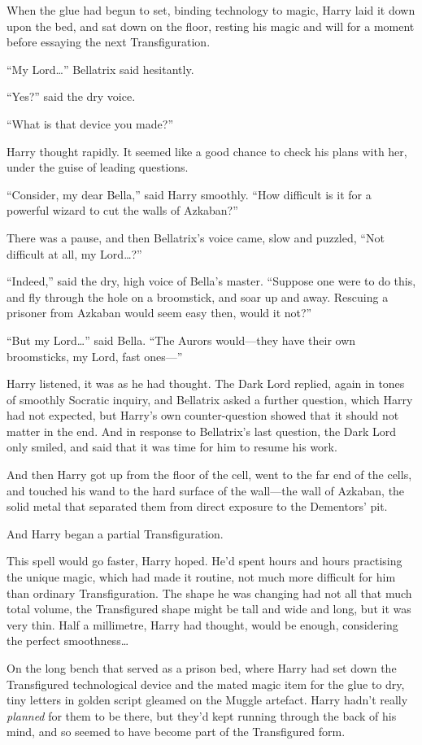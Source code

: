When the glue had begun to set, binding technology to magic, Harry laid it down upon the bed, and sat down on the floor, resting his magic and will for a moment before essaying the next Transfiguration.

“My Lord…” Bellatrix said hesitantly.

“Yes?” said the dry voice.

“What is that device you made?”

Harry thought rapidly. It seemed like a good chance to check his plans with her, under the guise of leading questions.

“Consider, my dear Bella,” said Harry smoothly. “How difficult is it for a powerful wizard to cut the walls of Azkaban?”

There was a pause, and then Bellatrix’s voice came, slow and puzzled, “Not difficult at all, my Lord…?”

“Indeed,” said the dry, high voice of Bella’s master. “Suppose one were to do this, and fly through the hole on a broomstick, and soar up and away. Rescuing a prisoner from Azkaban would seem easy then, would it not?”

“But my Lord…” said Bella. “The Aurors would—they have their own broomsticks, my Lord, fast ones—”

Harry listened, it was as he had thought. The Dark Lord replied, again in tones of smoothly Socratic inquiry, and Bellatrix asked a further question, which Harry had not expected, but Harry’s own counter-question showed that it should not matter in the end. And in response to Bellatrix’s last question, the Dark Lord only smiled, and said that it was time for him to resume his work.

And then Harry got up from the floor of the cell, went to the far end of the cells, and touched his wand to the hard surface of the wall—the wall of Azkaban, the solid metal that separated them from direct exposure to the Dementors’ pit.

And Harry began a partial Transfiguration.

This spell would go faster, Harry hoped. He’d spent hours and hours practising the unique magic, which had made it routine, not much more difficult for him than ordinary Transfiguration. The shape he was changing had not all that much total volume, the Transfigured shape might be tall and wide and long, but it was very thin. Half a millimetre, Harry had thought, would be enough, considering the perfect smoothness…

On the long bench that served as a prison bed, where Harry had set down the Transfigured technological device and the mated magic item for the glue to dry, tiny letters in golden script gleamed on the Muggle artefact. Harry hadn’t really \emph{planned} for them to be there, but they’d kept running through the back of his mind, and so seemed to have become part of the Transfigured form.

